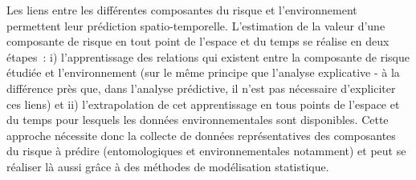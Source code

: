 \documentclass[12pt,twoside]{reedthesis}
\begin{document}
Les liens entre les différentes composantes du risque et l'environnement permettent leur prédiction spatio-temporelle. L'estimation de la valeur d'une composante de risque en tout point de l'espace et du temps se réalise en deux étapes~: i) l'apprentissage des relations qui existent entre la composante de risque étudiée et l'environnement (sur le même principe que l'analyse explicative - à la différence près que, dans l'analyse prédictive, il n'est pas nécessaire d'expliciter ces liens) et ii) l'extrapolation de cet apprentissage en tous points de l'espace et du temps pour lesquels les données environnementales sont disponibles. Cette approche nécessite donc la collecte de données représentatives des composantes du risque à prédire (entomologiques et environnementales notamment) et peut se réaliser là aussi grâce à des méthodes de modélisation statistique.\\

\hfill\break
\end{document}
